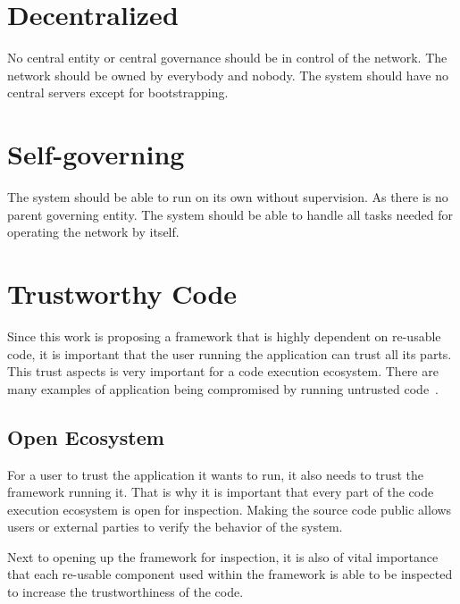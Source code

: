 \section{Decentralized}
No central entity or central governance should be in control of the network. The network should be owned by everybody and nobody. The system should have no central servers except for bootstrapping. 

\section{Self-governing}
The system should be able to run on its own without supervision. As there is no parent governing entity. The system should be able to handle all tasks needed for operating the network by itself.

\section{Trustworthy Code}


Since this work is proposing a framework that is highly dependent on re-usable code, it is important that the user running the application can trust all its parts. This trust aspects is very important for a code execution ecosystem. There are many examples of application being compromised by running untrusted code~\cite{purescript}\cite{docker}.

\subsection{Open Ecosystem}
For a user to trust the application it wants to run, it also needs to trust the framework running it. That is why it is important that every part of the code execution ecosystem is open for inspection. Making the source code public allows users or external parties to verify the behavior of the system. 

Next to opening up the framework for inspection, it is also of vital importance that each re-usable component used within the framework is able to be inspected to increase the trustworthiness of the code.


